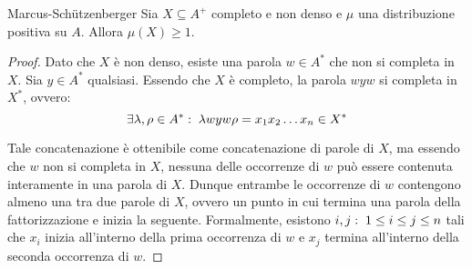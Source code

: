 \begin{lemma}[label=lem:marcus-schutzenberger]{Marcus-Schützenberger}
  Sia \(X \subseteq A^+\) completo e non denso e \(\mu\) una distribuzione positiva su \(A\).
  Allora \(\mu(X) \geq 1\).
\end{lemma}
\begin{proof}
  Dato che \(X\) è non denso, esiste una parola \(w \in A^*\) che non si completa in \(X\).
  Sia \(y \in A^*\) qualsiasi.
  Essendo che \(X\) è completo, la parola \(wyw\) si completa in \(X^*\), ovvero:
  \[\exists \lambda,\rho \in A^*:\; \lambda w y w \rho  = x_1x_2\ldots x_n\in X^*\]
  \begin{figure}[H]
    \centering
  \end{figure}

  Tale concatenazione è ottenibile come concatenazione di parole di \(X\), ma essendo che \(w\) non si completa in \(X\), nessuna delle occorrenze di \(w\) può essere contenuta interamente in una parola di \(X\).
  Dunque entrambe le occorrenze di \(w\) contengono almeno una  tra due parole di \(X\), ovvero un punto in cui termina una parola della fattorizzazione e inizia la seguente.
  Formalmente, esistono \(i,j :\; 1 \leq i \leq j \leq n\) tali che \(x_i\) inizia all'interno della prima occorrenza di \(w\) e \(x_j\) termina all'interno della seconda occorrenza di \(w\).


\end{proof}

